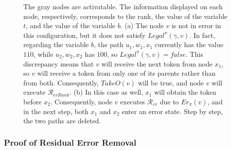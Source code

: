 \documentclass[a4paper, 12pt]{article}
\newcommand{\bz}{\mathbf{0}}
\newcommand{\Rer}{$\mathscr{R}_{er}$}
\newcommand{\RerRank}{$\mathscr{R}_{erRank}$}
\begin{document}
\begin{figure}
\begin{subfigure}{0.10\textwidth}
\caption{}
\end{subfigure}
\label{fig:notLegalPi}
        \caption{ The gray nodes are activatable. The information displayed on each node, respectively, corresponds to the rank, the value of the variable $t$, and the value of the variable $b$. (a) The node $v$ is not in error in this configuration, but it does not satisfy $Legal^{\pi}(\gamma,v)$. In fact, regarding the variable $b$, the path $u_1, w_1, x_1$ currently has the value $110$, while  $u_2, w_2, x_2$ has $100$, so $Legal^{\pi}(\gamma,v)=\mathit{false}$. This discrepancy means that $v$ will receive the next token from node $x_1$, so $v$ will receive a token from only one of its parents rather than from both. Consequently, $TakeO(v)$ will be true, and node $v$ will execute \RerRank. (b) In this case as well, $x_1$ will obtain the token before $x_2$. Consequently, node $v$ executes \Rer\/ due to $Er_\pi(v)$, and in the next step, both $x_1$ and $x_2$ enter an error state. Step by step, the two paths are deleted.  }
        \label{fig:badPath}
\end{figure}

\subsubsection{Proof of Residual Error Removal}
\label{subsub:proofclean}
\end{document}
